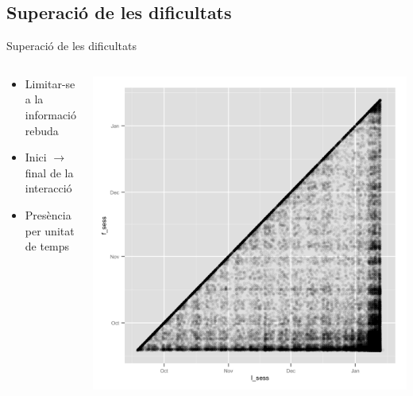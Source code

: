 \documentclass[xcolor=x11names,
								compress,
								aspectratio=1610]{beamer}
\theoremstyle{definition}%
\renewcommand{\(}{\begin{columns}}
\renewcommand{\)}{\end{columns}}
\newcommand{\<}[1]{\begin{column}{#1}}
\renewcommand{\>}{\end{column}}
\begin{document}
	\subsection{Superació de les dificultats}
		\begin{frame}{Superació de les dificultats}
		\begin{columns}[onlytextwidth]
  		\begin{column}{.5\textwidth}
				\begin{itemize}
				\item Limitar-se a la informació rebuda
				\item Inici $\rightarrow$ final de la interacció
				\item Presència per unitat de temps
				\end{itemize}
			\end{column}
  		\begin{column}{.5\textwidth}
  		\includegraphics[width = \textwidth]{user_first_last_scatter}
  		\end{column}
		\end{columns}
	\end{frame}
\end{document}
